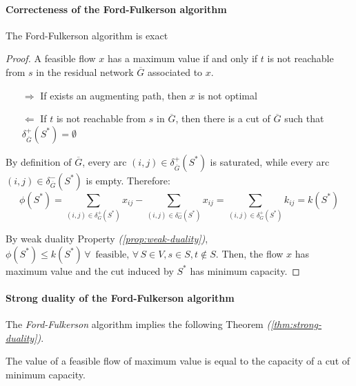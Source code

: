 \documentclass[english]{article}
\begin{document}
\paragraph{Correcteness of the Ford-Fulkerson algorithm}

\begin{proposition}
  The Ford-Fulkerson algorithm is exact
\end{proposition}

\begin{proof}
  A feasible flow \(x\) has a maximum value if and only if \(t\) is not reachable from \(s\) in the residual network \(\overline{G}\) associated to \(x\).

  \begin{itemize}
    \item[\(\Rightarrow\)] If exists an augmenting path, then \(x\) is not optimal
    \item[\(\Leftarrow\)] If \(t\) is not reachable from \(s\) in \(\overline{G}\), then there is a cut of \(\overline{G}\) such that \(\delta^+_{\overline{G}}(S^\ast) = \emptyset\)
  \end{itemize}

  By definition of \(\overline{G}\), every arc \(\left( i, j \right) \in \delta^+_{\overline{G}}(S^\ast)\) is saturated, while every arc \(\left( i, j \right) \in \delta^-_{\overline{G}}(S^\ast)\) is empty.
  Therefore:
  \[ \phi(S^\ast) = \displaystyle \sum_{\left( i, j \right) \in \delta^+_G(S^\ast) } x_{ij} - \displaystyle \sum_{\left( i, j \right) \in \delta^-_G(S^\ast) } x_{ij} = \displaystyle \sum_{\left( i, j \right) \in \delta^+_G(S^\ast) } k_{ij} = k(S^\ast) \]

  By weak duality Property \textit{(\ref{prop:weak-duality})}, \(\phi(S^\ast) \leq k(S^\ast) \, \forall \, \text{ feasible}, \, \forall \, S \in V, s\in S, t \notin S\).
  Then, the flow \(x\) has maximum value and the cut induced by \(S^\ast\) has minimum capacity.
\end{proof}

\paragraph{Strong duality of the Ford-Fulkerson algorithm}

The \textit{Ford-Fulkerson} algorithm implies the following Theorem \textit{(\ref{thm:strong-duality})}.

\begin{theorem}
  The value of a feasible flow of maximum value is equal to the capacity of a cut of minimum capacity.
  \label{thm:strong-duality}
\end{theorem}
\end{document}
